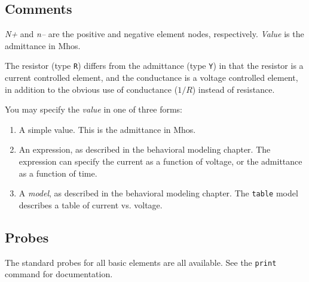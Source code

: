 \subsection{Comments}

{\it N+} and {\it n--} are the positive and negative element nodes,
respectively.  {\it Value} is the admittance in Mhos.

The resistor (type {\tt R}) differs from the admittance (type {\tt Y}) in
that the resistor is a current controlled element, and the conductance is a
voltage controlled element, in addition to the obvious use of conductance
($1/R$) instead of resistance.

You may specify the {\it value} in one of three forms:

\begin{enumerate}
  
\item
A simple value.  This is the admittance in Mhos.
  
\item
An expression, as described in the behavioral modeling chapter.  The
expression can specify the current as a function of voltage, or the
admittance as a function of time.

\item
A {\it model}, as described in the behavioral modeling chapter.  The
{\tt table} model describes a table of current vs. voltage.

\end{enumerate}
\subsection{Probes}

The standard probes for all basic elements are all available.  See the
{\tt print} command for documentation.
